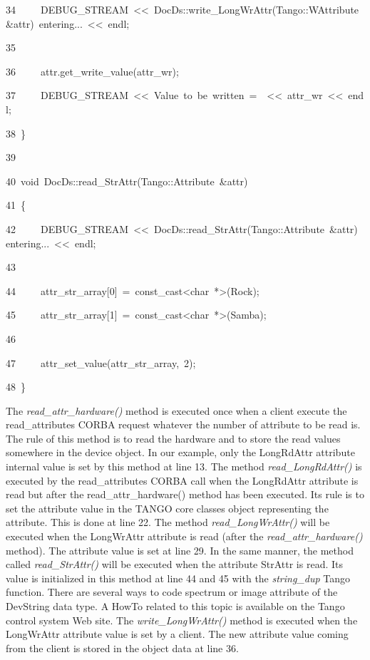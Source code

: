 \begin{lyxcode}
34~~~~~DEBUG\_STREAM~<\textcompwordmark{}<~\textquotedbl{}DocDs::write\_LongWrAttr(Tango::WAttribute~\&attr)~entering...~\textquotedbl{}<\textcompwordmark{}<~endl;

35~

36~~~~~attr.get\_write\_value(attr\_wr);

37~~~~~DEBUG\_STREAM~<\textcompwordmark{}<~\textquotedbl{}Value~to~be~written~=~\textquotedbl{}~<\textcompwordmark{}<~attr\_wr~<\textcompwordmark{}<~endl;

38~\}

39~

40~void~DocDs::read\_StrAttr(Tango::Attribute~\&attr)

41~\{

42~~~~~DEBUG\_STREAM~<\textcompwordmark{}<~\textquotedbl{}DocDs::read\_StrAttr(Tango::Attribute~\&attr)~entering...~\textquotedbl{}<\textcompwordmark{}<~endl;

43~

44~~~~~attr\_str\_array{[}0{]}~=~const\_cast<char~{*}>(\textquotedbl{}Rock\textquotedbl{});

45~~~~~attr\_str\_array{[}1{]}~=~const\_cast<char~{*}>(\textquotedbl{}Samba\textquotedbl{});

46~

47~~~~~attr\_set\_value(attr\_str\_array,~2);

48~\}
\end{lyxcode}


The \emph{read\_attr\_hardware()} method
is executed once when a client execute the read\_attributes
CORBA request whatever the number of attribute to be read is. The
rule of this method is to read the hardware and to store the read
values somewhere in the device object. In our example, only the LongRdAttr
attribute internal value is set by this method at line 13. The method
\emph{read\_LongRdAttr()} is executed by the read\_attributes
CORBA call when the LongRdAttr attribute is read but after the read\_attr\_hardware()
method has been executed. Its rule is to set the attribute value in
the TANGO core classes object representing the attribute. This is
done at line 22. The method \emph{read\_LongWrAttr()} will be executed
when the LongWrAttr attribute is read (after the \emph{read\_attr\_hardware()}
method). The attribute value is set at line 29. In the same manner,
the method called \emph{read\_StrAttr()} will be executed when the
attribute StrAttr is read. Its value is initialized in this method
at line 44 and 45 with the \emph{string\_dup} Tango
function. There are several ways to code spectrum or image attribute
of the DevString data type. A HowTo related to this topic is available
on the Tango control system Web site. The \emph{write\_LongWrAttr()}
method is executed when the LongWrAttr attribute
value is set by a client. The new attribute value coming from the
client is stored in the object data at line 36.

